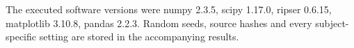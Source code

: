 The executed software versions were numpy 2.3.5, scipy 1.17.0, ripser 0.6.15, matplotlib 3.10.8, pandas 2.2.3. Random seeds, source hashes and every subject-specific setting are stored in the accompanying results.

